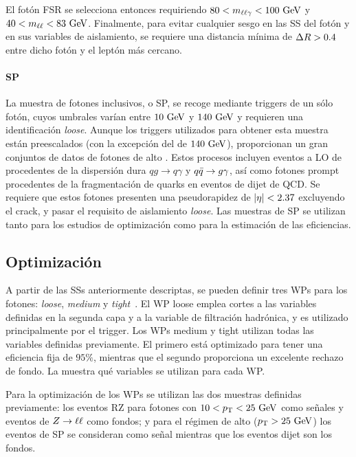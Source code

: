 El fotón \ac{FSR} se selecciona entonces requiriendo \(80<m_{\ell\ell\gamma}<100~\text{GeV}\) y \(40<m_{\ell\ell}<83~\text{GeV}\). Finalmente, para evitar cualquier sesgo en las \ac{SS} del fotón y en sus variables de aislamiento, se requiere una distancia mínima de \(\Delta R>0.4\) entre dicho fot\'on y el leptón más cercano.


\paragraph{\acf{SP}}

La muestra de fotones inclusivos, o \acf{SP}, se recoge mediante triggers de un s\'olo fot\'on, cuyos umbrales var\'ian entre \(10~\text{GeV}\) y \(140~\text{GeV}\) y requieren una identificación \textit{loose}. Aunque los triggers utilizados para obtener esta muestra están preescalados (con la excepción del de \(140~\text{GeV}\)), proporcionan un gran conjuntos de datos de fotones de alto \pt.
Estos procesos incluyen eventos a \ac{LO} de \gammajet procedentes de la dispersión dura \(qg\to q\gamma\) y \(q\bar{q} \rightarrow g\gamma\), así como fotones prompt procedentes de la fragmentación de quarks en eventos de dijet de \acs{QCD}.
Se requiere que estos fotones presenten una pseudorapidez de \(|\eta|<2.37\) excluyendo el crack, y pasar el requisito de aislamiento \textit{loose}. Las muestras de \ac{SP} se utilizan tanto para los estudios de optimización como para la estimaci\'on de las eficiencias.


\subsection{Optimizaci\'on}
\label{subsec:pid_ss:pid:optimisation}

A partir de las \acp{SS} anteriormente descriptas, se pueden definir tres \acp{WP} para los fotones: \textit{loose}, \textit{medium} y \textit{tight}~\cite{ATLAS-EGamma-Performance-2024}. El \ac{WP} loose emplea cortes a las variables definidas en la segunda capa y a la variable de filtraci\'on hadrónica, y es utilizado principalmente por el trigger.
Los \acp{WP} medium y tight utilizan todas las variables definidas previamente. El primero está optimizado para tener una eficiencia fija de \(95\%\), mientras que el segundo proporciona un excelente rechazo de fondo. La \Tab{\ref{tab:pid_ss:ss:ss_variables}} muestra qué variables se utilizan para cada \ac{WP}.

Para la optimización de los \acp{WP} se utilizan las dos muestras definidas previamente: los eventos \ac{RZ} para fotones con \(10<p_{\text{T}}<25~\text{GeV}\) como señales y eventos de \(Z\rightarrow \ell\ell\) como fondos; y para el régimen de alto \pt (\(p_{\text{T}}>25~\text{GeV}\)) los eventos de \ac{SP} se consideran como señal mientras que los eventos dijet son los fondos.

